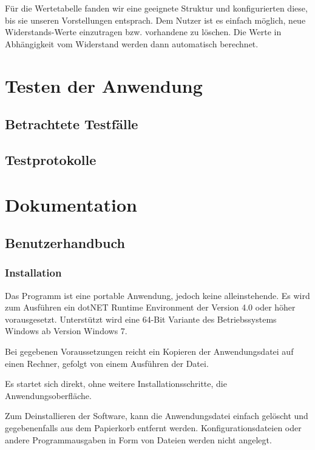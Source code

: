\documentclass[a4paper]{article}
\begin{document}
    Für die Wertetabelle fanden wir eine geeignete Struktur und konfigurierten diese, bis sie unseren Vorstellungen entsprach.
    Dem Nutzer ist es einfach möglich, neue Widerstands-Werte einzutragen bzw. vorhandene zu löschen.
    Die Werte in Abhängigkeit vom Widerstand werden dann automatisch berechnet.

\newpage
\section{Testen der Anwendung}

\subsection{Betrachtete Testfälle}


\subsection{Testprotokolle}


\newpage
\section{Dokumentation}

\subsection{Benutzerhandbuch}
    \subsubsection{Installation}

    Das Programm ist eine portable Anwendung, jedoch keine alleinstehende.
    Es wird zum Ausführen ein \glqq dotNET Runtime Environment\grqq{} der Version 4.0 oder höher vorausgesetzt.
    Unterstützt wird eine 64-Bit Variante des Betriebssystems Windows ab Version \glqq Windows 7\grqq{}.

    Bei gegebenen Voraussetzungen reicht ein Kopieren der Anwendungsdatei auf einen Rechner, gefolgt von einem Ausführen der Datei.

    Es startet sich direkt, ohne weitere Installationsschritte, die Anwendungsoberfläche.

    Zum Deinstallieren der Software, kann die Anwendungsdatei einfach gelöscht und gegebenenfalls aus dem Papierkorb entfernt werden.
    Konfigurationsdateien oder andere Programmausgaben in Form von Dateien werden nicht angelegt.
\end{document}

